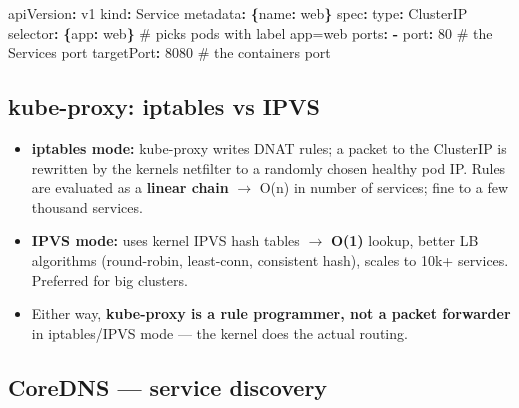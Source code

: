 \documentclass[11pt]{article}
\providecommand{\tightlist}{\setlength{\itemsep}{1pt}\setlength{\parskip}{0pt}}
\newenvironment{Shaded}{\begin{snugshade}}{\end{snugshade}}
\newcommand{\AttributeTok}[1]{\textcolor[rgb]{0.16,0.50,0.73}{#1}}
\newcommand{\CommentTok}[1]{\textcolor[rgb]{0.48,0.49,0.49}{#1}}
\newcommand{\DecValTok}[1]{\textcolor[rgb]{0.96,0.45,0.00}{#1}}
\newcommand{\FunctionTok}[1]{\textcolor[rgb]{0.56,0.27,0.68}{#1}}
\newcommand{\KeywordTok}[1]{\textcolor[rgb]{0.81,0.81,0.76}{\textbf{#1}}}
\begin{document}

\begin{Shaded}
\begin{Highlighting}[]
\FunctionTok{apiVersion}\KeywordTok{:}\AttributeTok{ v1}
\FunctionTok{kind}\KeywordTok{:}\AttributeTok{ Service}
\FunctionTok{metadata}\KeywordTok{:}\AttributeTok{ }\KeywordTok{\{}\FunctionTok{name}\KeywordTok{:}\AttributeTok{ web}\KeywordTok{\}}
\FunctionTok{spec}\KeywordTok{:}
\AttributeTok{  }\FunctionTok{type}\KeywordTok{:}\AttributeTok{ ClusterIP}
\AttributeTok{  }\FunctionTok{selector}\KeywordTok{:}\AttributeTok{ }\KeywordTok{\{}\FunctionTok{app}\KeywordTok{:}\AttributeTok{ web}\KeywordTok{\}}\CommentTok{        \# picks pods with label app=web}
\AttributeTok{  }\FunctionTok{ports}\KeywordTok{:}
\AttributeTok{    }\KeywordTok{{-}}\AttributeTok{ }\FunctionTok{port}\KeywordTok{:}\AttributeTok{ }\DecValTok{80}\CommentTok{                 \# the Service\textquotesingle{}s port}
\AttributeTok{      }\FunctionTok{targetPort}\KeywordTok{:}\AttributeTok{ }\DecValTok{8080}\CommentTok{         \# the container\textquotesingle{}s port}
\end{Highlighting}
\end{Shaded}

\subsection{kube-proxy: iptables vs IPVS}\label{kube-proxy-iptables-vs-ipvs}

\begin{itemize}
\tightlist
\item
  \textbf{iptables mode:} kube-proxy writes DNAT rules; a packet to the ClusterIP is rewritten by the kernel\textquotesingle s netfilter to a randomly chosen healthy pod IP. Rules are evaluated as a \textbf{linear chain} \(\rightarrow\) O(n) in number of services; fine to a few thousand services.
\item
  \textbf{IPVS mode:} uses kernel IPVS hash tables \(\rightarrow\) \textbf{O(1)} lookup, better LB algorithms (round-robin, least-conn, consistent hash), scales to 10k+ services. Preferred for big clusters.
\item
  Either way, \textbf{kube-proxy is a rule programmer, not a packet forwarder} in iptables/IPVS mode --- the kernel does the actual routing.
\end{itemize}

\subsection{CoreDNS --- service discovery}\label{coredns--service-discovery}
\end{document}

